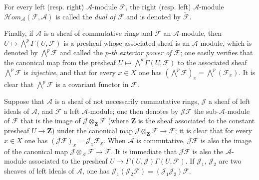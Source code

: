 \begin{env}[4.1.5]
For every left (resp. right) $\mathcal{A}$-module $\mathcal{F}$, the
right (resp. left) $\mathcal{A}$-module
$\mathcal{H}\!om_{\mathcal{A}}(\mathcal{F},\mathcal{A})$ is called the
\emph{dual of $\mathcal{F}$} and is denoted by $\check{\mathcal{F}}$.

Finally, if $\mathcal{A}$ is a sheaf of commutative rings and
$\mathcal{F}$ an $\mathcal{A}$-module, then
$U\mapsto\bigwedge^p\Gamma(U,\mathcal{F})$ is a presheaf whose
associated sheaf is an $\mathcal{A}$-module, which is denoted by
$\bigwedge^p\mathcal{F}$ and called the \emph{$p$-th exterior power
of $\mathcal{F}$}; one easily verifies that the canonical map from the
presheaf $U\mapsto\bigwedge^p\Gamma(U,\mathcal{F})$ to the
associated sheaf $\bigwedge^p\mathcal{F}$ is \emph{injective}, and that for every
$x\in X$ one has
$(\bigwedge^p\mathcal{F})_x=\bigwedge^p(\mathcal{F}_x)$. It is clear that
$\bigwedge^p\mathcal{F}$ is a covariant functor in $\mathcal{F}$.
\end{env}

\begin{env}[4.1.6]
\label{0.4.1.6}
Suppose that $\mathcal{A}$ is a sheaf of not necessarily
commutative rings, $\mathcal{J}$ a sheaf of left ideals of $\mathcal{A}$,
and $\mathcal{F}$ a left $\mathcal{A}$-module; one then denotes by
$\mathcal{J}\mathcal{F}$ the sub-$\mathcal{A}$-module of $\mathcal{F}$
that is the image of $\mathcal{J}\otimes_{\mathbf Z}\mathcal{F}$ (where $\mathbf Z$ is the
sheaf associated to the constant presheaf $U\to\mathbf Z$) under the
canonical map $\mathcal{J}\otimes_{\mathbf Z}\mathcal{F}\to\mathcal{F}$; it is
clear that for every $x\in X$ one has
$(\mathcal{J}\mathcal{F})_x=\mathcal{J}_x\mathcal{F}_x$. When
$\mathcal{A}$ is commutative, $\mathcal{J}\mathcal{F}$ is also the image
of the canonical map $\mathcal{J}\otimes_{\mathcal{A}}\mathcal{F}\to\mathcal{F}$.
It is immediate that $\mathcal{J}\mathcal{F}$ is also the
$\mathcal{A}$-module associated to the presheaf
$U\to\Gamma(U,\mathcal{J})\Gamma(U,\mathcal{F})$. If
$\mathcal{J}_1$, $\mathcal{J}_2$ are two sheaves of left ideals of
$\mathcal{A}$, one has
$\mathcal{J}_1(\mathcal{J}_2\mathcal{F})=(\mathcal{J}_1\mathcal{J}_2)\mathcal{F}$.
\end{env}

